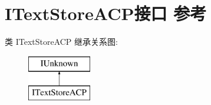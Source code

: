 \hypertarget{interface_i_text_store_a_c_p}{}\section{I\+Text\+Store\+A\+C\+P接口 参考}
\label{interface_i_text_store_a_c_p}
类 I\+Text\+Store\+A\+CP 继承关系图\+:\begin{figure}[H]
\begin{center}
\leavevmode
\includegraphics[height=2.000000cm]{interface_i_text_store_a_c_p}
\end{center}
\end{figure}
